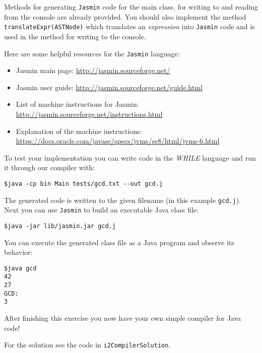 \documentclass[a4paper]{article}
\begin{document}
\begin{exercise}{10}
Methods for generating \texttt{Jasmin} code for the main class, for writing to and reading from the console are already provided. You should also implement the method \texttt{translateExpr(ASTNode)} which translates an \emph{expression} into \texttt{Jasmin} code and is used in the method for writing to the console.

Here are some helpful resources for the \texttt{Jasmin} language:
  \begin{itemize}
    \item Jasmin main page: \href{http://jasmin.sourceforge.net/}{http://jasmin.sourceforge.net/}
    \item Jasmin user guide: \href{http://jasmin.sourceforge.net/guide.html}{http://jasmin.sourceforge.net/guide.html}
    \item List of machine instructions for Jasmin: \href{http://jasmin.sourceforge.net/instructions.html}{http://jasmin.sourceforge.net/instructions.html}
    \item Explanation of the machine instructions: \href{https://docs.oracle.com/javase/specs/jvms/se8/html/jvms-6.html}{https://docs.oracle.com/javase/specs/jvms/se8/html/jvms-6.html}
  \end{itemize}

  To test your implementation you can write code in the \textit{WHILE} language and run it through our compiler with:
  \begin{lstlisting}[basicstyle=\ttfamily,numbers=none]
$java -cp bin Main tests/gcd.txt --out gcd.j
   \end{lstlisting}
  The generated code is written to the given filename (in this example \texttt{gcd.j}). Next you can use \texttt{Jasmin} to build an executable Java class file:
  \begin{lstlisting}[basicstyle=\ttfamily,numbers=none]
$java -jar lib/jasmin.jar gcd.j
   \end{lstlisting}
You can execute the generated class file as a Java program and observe its behavior:
  \begin{lstlisting}[basicstyle=\ttfamily,numbers=none]
$java gcd
42
27
GCD: 
3
   \end{lstlisting}

  After finishing this exercise you now have your own simple compiler for Java code!
\end{exercise}

\begin{solution}
  For the solution see the code in \texttt{i2CompilerSolution}.
\end{solution}
\end{document}
